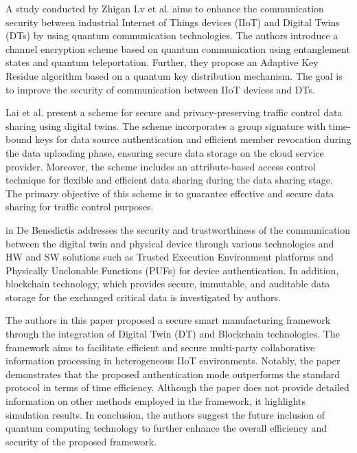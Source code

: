 A study conducted by Zhigan Lv et al.\cite{lvDigitalTwinsBased2022} aims to enhance the communication security between industrial Internet of Things devices (IIoT) and Digital Twins (DTs) by using quantum communication technologies. The authors introduce a channel encryption scheme based on quantum communication using entanglement states and quantum teleportation. Further, they propose an Adaptive Key Residue algorithm based on a quantum key distribution mechanism. The goal is to improve the security of communication between IIoT devices and DTs.


Lai et al.\cite{chengzhelaiSPDTSecurePrivacyPreserving2022} present a scheme for secure and privacy-preserving traffic control data sharing using digital twins. The scheme incorporates a group signature with time-bound keys for data source authentication and efficient member revocation during the data uploading phase, ensuring secure data storage on the cloud service provider. Moreover, the scheme includes an attribute-based access control technique for flexible and efficient data sharing during the data sharing stage. The primary objective of this scheme is to guarantee effective and secure data sharing for traffic control purposes.

in\cite{debenedictisAdoptionSecureCyber2022} De Benedictis addresses the security and trustworthiness of the communication between the digital twin and physical device through various technologies and HW and SW solutions such as Trusted Execution Environment platforms and Physically Unclonable Functions (PUFs) for device authentication. In addition, blockchain technology, which provides secure, immutable, and auditable data storage for the exchanged critical data is investigated by authors. 


The authors in this paper \cite{chenDigitalTwinBasedHeuristic2023a} proposed a secure smart manufacturing framework through the integration of Digital Twin (DT) and Blockchain technologies. The framework aims to facilitate efficient and secure multi-party collaborative information processing in heterogeneous IIoT environments. Notably, the paper demonstrates that the proposed authentication mode outperforms the standard protocol in terms of time efficiency. Although the paper does not provide detailed information on other methods employed in the framework, it highlights simulation results. In conclusion, the authors suggest the future inclusion of quantum computing technology to further enhance the overall efficiency and security of the proposed framework.


